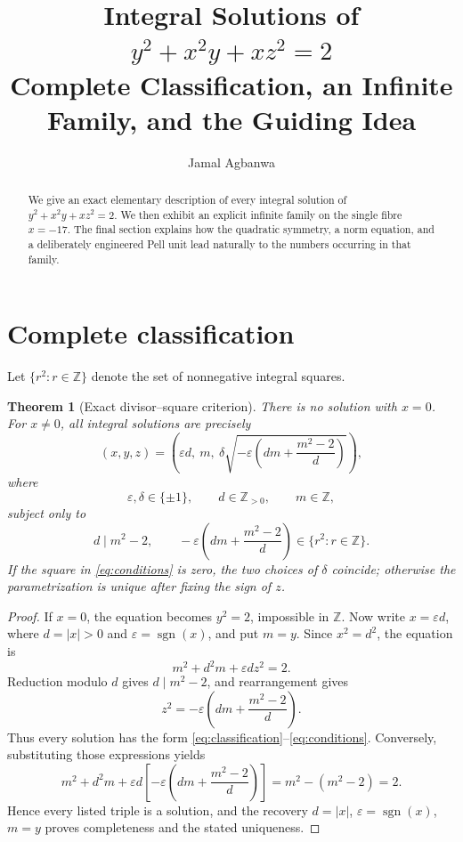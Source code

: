 \documentclass[11pt]{article}
\title{Integral Solutions of \texorpdfstring{$y^2+x^2y+xz^2=2$}{y2+x2y+xz2=2}\\[1mm]
\large Complete Classification, an Infinite Family, and the Guiding Idea}
\author{Jamal Agbanwa}
\date{}
\newtheorem{theorem}{Theorem}
\theoremstyle{remark}
\newcommand{\Sq}{\{r^2:r\in\mathbb Z\}}
\begin{document}
\maketitle
\vspace{-5mm}

\begin{abstract}
We give an exact elementary description of every integral solution of
$y^2+x^2y+xz^2=2$.  We then exhibit an explicit infinite family on the
single fibre $x=-17$.  The final section explains how the quadratic symmetry,
a norm equation, and a deliberately engineered Pell unit lead naturally to
the numbers occurring in that family.
\end{abstract}
\vspace{-2mm}

\section{Complete classification}

Let $\Sq$ denote the set of nonnegative integral squares.

\begin{theorem}[Exact divisor--square criterion]\label{thm:classification}
There is no solution with $x=0$.  For $x\ne0$, all integral solutions are
precisely
\begin{equation}\label{eq:classification}
 (x,y,z)=
 \left(
   \varepsilon d,\ m,\
   \delta\sqrt{-\varepsilon\left(dm+\frac{m^2-2}{d}\right)}
 \right),
\end{equation}
where
\[
 \varepsilon,\delta\in\{\pm1\},\qquad d\in\mathbb Z_{>0},\qquad m\in\mathbb Z,
\]
subject only to
\begin{equation}\label{eq:conditions}
 d\mid m^2-2,
 \qquad
 -\varepsilon\left(dm+\frac{m^2-2}{d}\right)\in\Sq.
\end{equation}
If the square in \eqref{eq:conditions} is zero, the two choices of $\delta$
coincide; otherwise the parametrization is unique after fixing the sign of
$z$.
\end{theorem}

\begin{proof}
If $x=0$, the equation becomes $y^2=2$, impossible in $\mathbb Z$.  Now write
$x=\varepsilon d$, where $d=|x|>0$ and $\varepsilon=\operatorname{sgn}(x)$,
and put $m=y$.  Since $x^2=d^2$, the equation is
\[
 m^2+d^2m+\varepsilon dz^2=2.
\]
Reduction modulo $d$ gives $d\mid m^2-2$, and rearrangement gives
\[
 z^2=-\varepsilon\left(dm+\frac{m^2-2}{d}\right).
\]
Thus every solution has the form \eqref{eq:classification}--\eqref{eq:conditions}.
Conversely, substituting those expressions yields
\[
 m^2+d^2m+\varepsilon d
 \left[-\varepsilon\left(dm+\frac{m^2-2}{d}\right)\right]
 =m^2-(m^2-2)=2.
\]
Hence every listed triple is a solution, and the recovery
$d=|x|$, $\varepsilon=\operatorname{sgn}(x)$, $m=y$ proves completeness and
the stated uniqueness.
\end{proof}
\end{document}
